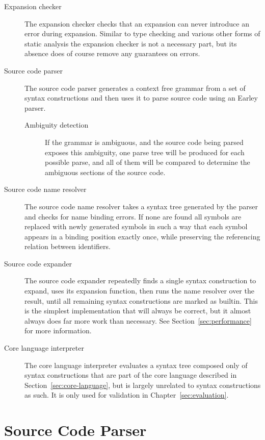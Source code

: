 \documentclass{kththesis}
\begin{document}
\begin{description}
  \item[Expansion checker] The expansion checker checks that an expansion can never introduce an error during expansion. Similar to type checking and various other forms of static analysis the expansion checker is not a necessary part, but its absence does of course remove any guarantees on errors.

  \item[Source code parser] The source code parser generates a context free grammar from a set of syntax constructions and then uses it to parse source code using an Earley parser.
  \begin{description}
    \item[Ambiguity detection] If the grammar is ambiguous, and the source code being parsed exposes this ambiguity, one parse tree will be produced for each possible parse, and all of them will be compared to determine the ambiguous sections of the source code.
  \end{description}

  \item[Source code name resolver] The source code name resolver takes a syntax tree generated by the parser and checks for name binding errors. If none are found all symbols are replaced with newly generated symbols in such a way that each symbol appears in a binding position exactly once, while preserving the referencing relation between identifiers.

  \item[Source code expander] The source code expander repeatedly finds a single syntax construction to expand, uses its expansion function, then runs the name resolver over the result, until all remaining syntax constructions are marked as builtin. This is the simplest implementation that will always be correct, but it almost always does far more work than necessary. See Section~\ref{sec:performance} for more information.

  \item[Core language interpreter] The core language interpreter evaluates a syntax tree composed only of syntax constructions that are part of the core language described in Section~\ref{sec:core-language}, but is largely unrelated to syntax constructions as such. It is only used for validation in Chapter~\ref{sec:evaluation}.
\end{description}

\section{Source Code Parser}
\end{document}
